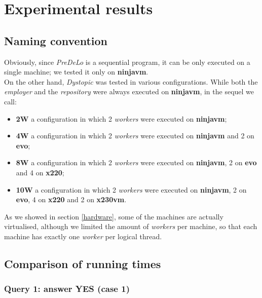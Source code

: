\documentclass[a4paper, 11pt, oneside]{duthesis}
\begin{document}
\section{Experimental results}

\subsection{Naming convention}

Obviously, since \emph{PreDeLo} is a sequential program, it can be only executed on a single machine; we tested it only on \textbf{ninjavm}.\\

On the other hand, \emph{Dystopic} was tested in various configurations.
While both the \emph{employer} and the \emph{repository} were always executed on \textbf{ninjavm}, in the sequel we call:

\begin{itemize}

\item \textbf{2W} a configuration in which 2 \emph{workers} were executed on \textbf{ninjavm};
\item \textbf{4W} a configuration in which 2 \emph{workers} were executed on \textbf{ninjavm} and 2 on \textbf{evo};
\item \textbf{8W} a configuration in which 2 \emph{workers} were executed on \textbf{ninjavm}, 2 on \textbf{evo} and 4 on \textbf{x220};
\item \textbf{10W} a configuration in which 2 \emph{workers} were executed on \textbf{ninjavm}, 2 on \textbf{evo}, 4 on \textbf{x220} and 2 on \textbf{x230vm}.

\end{itemize}

As we showed in section \ref{hardware}, some of the machines are actually virtualised, although we limited the amount of \emph{workers} per machine, so that each machine has exactly one \emph{worker} per logical thread.

\newpage


\subsection{Comparison of running times}

\subsubsection{Query 1: answer YES (case 1)}
\end{document}
